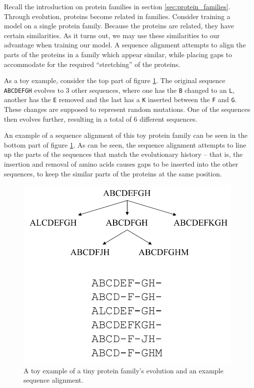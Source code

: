 Recall the introduction on protein families in section \ref{sec:protein_families}. Through evolution, proteins become related in families. Consider training a model on a single protein family. Because the proteins are related, they have certain similarities. As it turns out, we may use these similarities to our advantage when training our model. A sequence alignment attempts to align the parts of the proteins in a family which appear similar, while placing gaps to accommodate for the required ``stretching'' of the proteins.

As a toy example, consider the top part of figure \ref{fig:sequence_alignment_toy_example}. The original sequence \texttt{ABCDEFGH} evolves to 3 other sequences, where one has the \texttt{B} changed to an \texttt{L}, another has the \texttt{E} removed and the last has a \texttt{K} inserted between the \texttt{F} and \texttt{G}. These changes are supposed to represent random mutations. One of the sequences then evolves further, resulting in a total of 6 different sequences.

An example of a sequence alignment of this toy protein family can be seen in the bottom part of figure \ref{fig:sequence_alignment_toy_example}. As can be seen, the sequence alignment attempts to line up the parts of the sequences that match the evolutionary history -- that is, the insertion and removal of amino acids causes gaps to be inserted into the other sequences, to keep the similar parts of the proteins at the same position.

\begin{figure}[ht]
    \centering
    \includegraphics{report/figures/sequence_alignments.pdf}
    \caption{A toy example of a tiny protein family's evolution and an example sequence alignment. }
    \label{fig:sequence_alignment_toy_example}
\end{figure}

